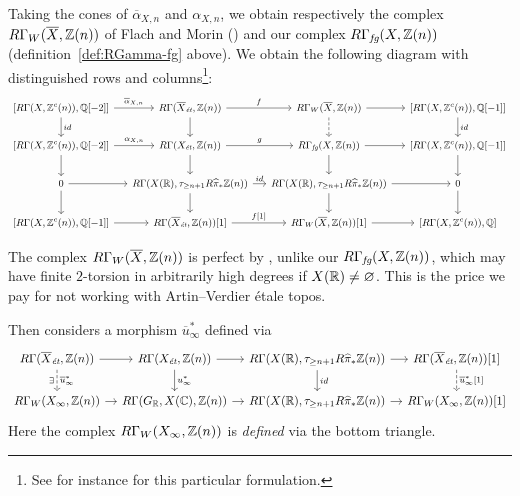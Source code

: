 \documentclass{article}
\numberwithin{equation}{section}
\begin{document}
Taking the cones of $\overline{\alpha}_{X,n}$ and $\alpha_{X,n}$, we obtain
respectively the complex $R\Gamma_W (\overline{X}, \mathbb{Z} (n))$ of Flach and Morin
(\cite[Definition~3.6]{Flach-Morin-2018}) and our complex
$R\Gamma_{\text{\it fg}} (X, \mathbb{Z}(n))$ (definition~\ref{def:RGamma-fg} above). We obtain the
following diagram with distinguished rows and columns\footnote{See for instance
  \cite[Proposition~1.4.6]{Neeman-2001} for this particular formulation.}:
\begin{equation}
  \label{eqn:cones-of-alphas}
  \begin{tikzcd}[column sep=1.25em,font=\small]
    {[R\Gamma (X, \ZZ^c (n)), \QQ [-2]]} \ar{r}{\overline{\alpha}_{X,n}}\ar{d}{id} & R\Gamma (\overline{X}_\et, \ZZ(n))\ar{d}\ar{r}{f} & R\Gamma_W (\overline{X}, \ZZ(n)) \ar{r}\ar[dashed]{d} & {[R\Gamma (X, \ZZ^c (n)), \QQ [-1]]}\ar{d}{id} \\
    {[R\Gamma (X, \ZZ^c (n)), \QQ [-2]]} \ar{r}{\alpha_{X,n}}\ar{d} & R\Gamma (X_\et, \ZZ(n)) \ar{r}{g}\ar{d} & R\Gamma_\fg (X, \ZZ(n)) \ar{r}\ar{d} & {[R\Gamma (X, \ZZ^c (n)), \QQ [-1]]}\ar{d} \\
    0\ar{r}\ar{d} & R\Gamma (X (\RR), \tau_{\ge n+1} R \widehat{\pi}_* \ZZ (n)) \ar{r}{id}\ar{d} & R\Gamma (X (\RR), \tau_{\ge n+1} R \widehat{\pi}_* \ZZ (n)) \ar{r}\ar{d} & 0\ar{d} \\
    {[R\Gamma (X, \ZZ^c (n)), \QQ [-1]]} \ar{r} & R\Gamma (\overline{X}_\et, \ZZ(n))[1]\ar{r}{f[1]} & R\Gamma_W (\overline{X}, \ZZ(n))[1] \ar{r} & {[R\Gamma (X, \ZZ^c (n)), \QQ]}
  \end{tikzcd}
\end{equation}

The complex $R\Gamma_W (\overline{X}, \mathbb{Z}(n))$ is perfect by
\cite[Proposition~3.8]{Flach-Morin-2018}, unlike our $R\Gamma_{\text{\it fg}} (X, \mathbb{Z}(n))$,
which may have finite $2$-torsion in arbitrarily high degrees if
$X (\mathbb{R}) \ne \varnothing$. This is the price we pay for not working with
Artin--Verdier étale topos.

Then \cite[Definition~3.23]{Flach-Morin-2018} considers a morphism
$\overline{u}^*_\infty$ defined via
\begin{equation}
  \label{eqn:definition-of-u-bar-infty}
  \begin{tikzcd}[column sep=1em]
    R\Gamma (\overline{X}_\et, \ZZ(n)) \ar{r}\ar[dashed]{d}[swap]{\exists}{\overline{u}_\infty^*} & R\Gamma (X_\et, \ZZ(n)) \ar{r}\ar{d}{u_\infty^*} & R\Gamma (X(\RR), \tau_{\ge n+1} R \widehat{\pi}_* \ZZ (n)) \ar{r}\ar{d}{id} & R\Gamma (\overline{X}_\et, \ZZ(n)) [1] \ar[dashed]{d}{\overline{u}_\infty^* [1]} \\
    R\Gamma_W (X_\infty, \ZZ (n)) \ar{r} & R\Gamma (G_\RR, X (\CC), \ZZ (n)) \ar{r} & R\Gamma (X(\RR), \tau_{\ge n+1} R \widehat{\pi}_* \ZZ (n)) \ar{r} & R\Gamma_W (X_\infty, \ZZ (n)) [1]
  \end{tikzcd}
\end{equation}
Here the complex $R\Gamma_W (X_\infty, \mathbb{Z}(n))$ is \emph{defined} via the bottom
triangle.
\end{document}
